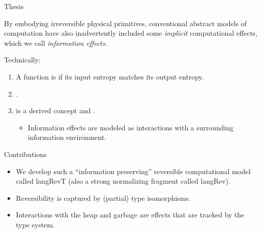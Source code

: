 \documentclass[svgnames,11pt]{beamer}
\newcommand{\red}[1]{{\color{red}{#1}}}
\begin{document}
\begin{frame}{Thesis}

\vfill
  \begin{block}

    By embodying irreversible physical primitives, conventional
    abstract models of computation have also inadvertently included
    some \emph{implicit} computational effects, which we call
    \emph{information effects}.
  \end{block}


\vfill
\pause
Technically:

  \begin{enumerate}
    \item A function is \red{information preserving} if its input entropy
      matches its output entropy.

  \item \red{Logically reversible functions are information
    preserving}.


  \item \red{Irreversibility} is a derived concept and \red{is captured by a
    type-and-effect system}.

    \begin{itemize}
    \item Information effects are modeled as interactions with a
      surrounding information environment.
    \end{itemize}

  \end{enumerate}

\vfill
  
\end{frame}

\begin{frame}{ Contributions }
  


\vfill
  \begin{itemize}

  \item We develop such a ``information preserving'' reversible
    computational model called {{langRevT}} (also a strong normalizing
    fragment called {{langRev}}).

\vfill
  \item Reversibility is captured by (partial) type isomorphisms. 

\vfill
  \item Interactions with the heap and garbage are effects that are
    tracked by the type system.

\vfill
  \end{itemize}



\end{frame}
\end{document}
